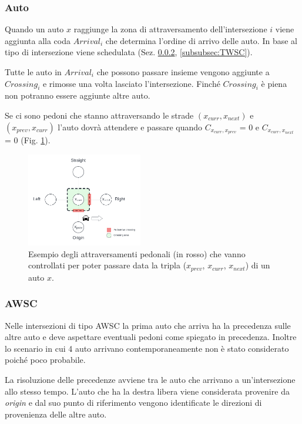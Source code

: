 \subsubsection{Auto}
Quando un auto $x$ raggiunge la zona di attraversamento dell'intersezione $i$ viene aggiunta alla coda $\textit{Arrival}_i$ che
determina l'ordine di arrivo delle auto. In base al tipo di intersezione viene schedulata (Sez. \ref{subsubsec:AWSC}, \ref{subsubsec:TWSC}).

Tutte le auto in $\textit{Arrival}_i$ che possono passare insieme vengono aggiunte a $\textit{Crossing}_i$ e rimosse una volta lasciato l'intersezione.
Finché $\textit{Crossing}_i$ è piena non potranno essere aggiunte altre auto.

%
Se ci sono pedoni che stanno attraversando le strade $(x_{curr}, x_{next})$ e $(x_{prev}, x_{curr})$ l'auto dovrà attendere
e passare quando $C_{x_{curr},x_{prev}}$ = 0 e $C_{x_{curr},x_{next}}$ = 0 (Fig. \ref{fig:auto-ped-crossing}).

\begin{figure}[ht]
    \centering
    \includegraphics[width=0.45\textwidth]{images/crossing_auto_ped_crossing}
    \caption{Esempio degli attraversamenti pedonali (in rosso) che vanno controllati
        per poter passare data la tripla ($x_{prev}$, $x_{curr}$, $x_{next}$) di un auto $x$.}
    \label{fig:auto-ped-crossing}
\end{figure}

\subsubsection{AWSC}
\label{subsubsec:AWSC}
Nelle intersezioni di tipo AWSC la prima auto che arriva ha la precedenza sulle altre auto e deve aspettare eventuali pedoni come spiegato in precedenza.
Inoltre lo scenario in cui 4 auto arrivano contemporaneamente non è stato considerato poiché poco probabile.

La risoluzione delle precedenze avviene tra le auto che arrivano a un'intersezione allo stesso tempo.
L'auto che ha la destra libera viene considerata provenire da \textit{origin} e dal suo punto di riferimento
vengono identificate le direzioni di provenienza delle altre auto.

